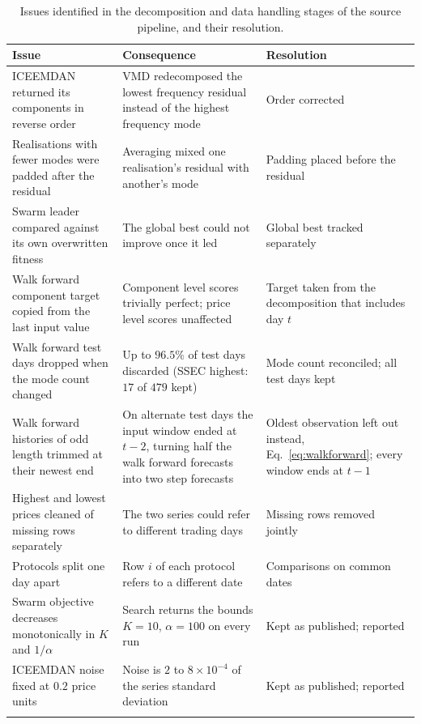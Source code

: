 \documentclass[pdflatex,sn-mathphys-num]{sn-jnl}%
\theoremstyle{thmstyleone}%
\theoremstyle{thmstyletwo}%
\theoremstyle{thmstylethree}%
\begin{document}
\begin{table}[ht]
\caption{Issues identified in the decomposition and data handling stages of the source pipeline, and their resolution.}
\label{tab:audit_decomp}
\small
\begin{tabular}{@{}L{0.30\textwidth}L{0.39\textwidth}L{0.23\textwidth}@{}}
\toprule
Issue & Consequence & Resolution \\
\midrule
ICEEMDAN returned its components in reverse order &
VMD redecomposed the lowest frequency residual instead of the highest frequency mode &
Order corrected \\
Realisations with fewer modes were padded after the residual &
Averaging mixed one realisation's residual with another's mode &
Padding placed before the residual \\
Swarm leader compared against its own overwritten fitness &
The global best could not improve once it led &
Global best tracked separately \\
Walk forward component target copied from the last input value &
Component level scores trivially perfect; price level scores unaffected &
Target taken from the decomposition that includes day $t$ \\
Walk forward test days dropped when the mode count changed &
Up to $96.5\%$ of test days discarded (SSEC highest: $17$ of $479$ kept) &
Mode count reconciled; all test days kept \\
Walk forward histories of odd length trimmed at their newest end &
On alternate test days the input window ended at $t-2$, turning half the walk forward forecasts into two step forecasts &
Oldest observation left out instead, Eq.~\eqref{eq:walkforward}; every window ends at $t-1$ \\
Highest and lowest prices cleaned of missing rows separately &
The two series could refer to different trading days &
Missing rows removed jointly \\
Protocols split one day apart &
Row $i$ of each protocol refers to a different date &
Comparisons on common dates \\
Swarm objective decreases monotonically in $K$ and $1/\alpha$ &
Search returns the bounds $K=10$, $\alpha=100$ on every run &
Kept as published; reported \\
ICEEMDAN noise fixed at $0.2$ price units &
Noise is $2$ to $8\times10^{-4}$ of the series standard deviation &
Kept as published; reported \\
\botrule
\end{tabular}
\end{table}
\end{document}
